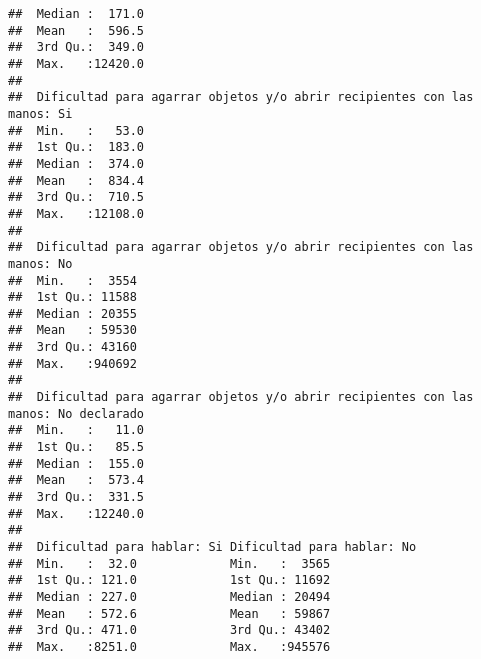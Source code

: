 \documentclass[11pt,]{article}
\begin{document}
\begin{verbatim}
##  Median :  171.0                                      
##  Mean   :  596.5                                      
##  3rd Qu.:  349.0                                      
##  Max.   :12420.0                                      
##                                                       
##  Dificultad para agarrar objetos y/o abrir recipientes con las manos: Si
##  Min.   :   53.0                                                        
##  1st Qu.:  183.0                                                        
##  Median :  374.0                                                        
##  Mean   :  834.4                                                        
##  3rd Qu.:  710.5                                                        
##  Max.   :12108.0                                                        
##                                                                         
##  Dificultad para agarrar objetos y/o abrir recipientes con las manos: No
##  Min.   :  3554                                                         
##  1st Qu.: 11588                                                         
##  Median : 20355                                                         
##  Mean   : 59530                                                         
##  3rd Qu.: 43160                                                         
##  Max.   :940692                                                         
##                                                                         
##  Dificultad para agarrar objetos y/o abrir recipientes con las manos: No declarado
##  Min.   :   11.0                                                                  
##  1st Qu.:   85.5                                                                  
##  Median :  155.0                                                                  
##  Mean   :  573.4                                                                  
##  3rd Qu.:  331.5                                                                  
##  Max.   :12240.0                                                                  
##                                                                                   
##  Dificultad para hablar: Si Dificultad para hablar: No
##  Min.   :  32.0             Min.   :  3565            
##  1st Qu.: 121.0             1st Qu.: 11692            
##  Median : 227.0             Median : 20494            
##  Mean   : 572.6             Mean   : 59867            
##  3rd Qu.: 471.0             3rd Qu.: 43402            
##  Max.   :8251.0             Max.   :945576            

\end{verbatim}
\end{document}
